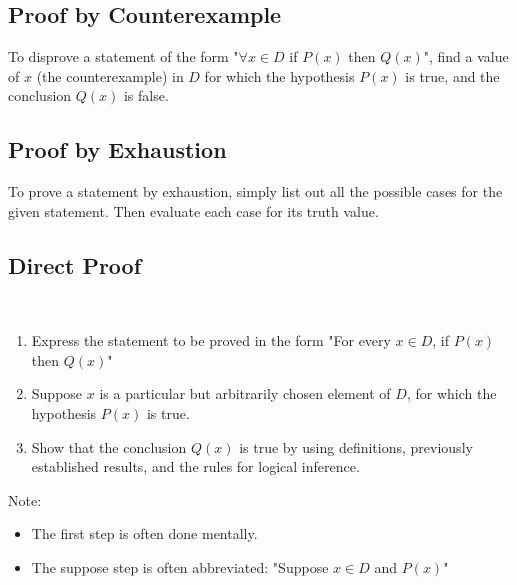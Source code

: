 \documentclass[11pt]{article}
\newcommand*\qistmt[4]{#1 $x \in #2$, if #3 then #4}
\begin{document}
\subsection{Proof by Counterexample}
\begin{definition}\label{def:proof-by-counterexample}
    To disprove a statement of the form "$\forall x \in D$ if $P(x)$ then $Q(x)$",
    find a value of $x$ (the counterexample) in $D$ for which the hypothesis $P(x)$
    is true, and the conclusion $Q(x)$ is false.
\end{definition}

\subsection{Proof by Exhaustion}
\begin{definition}\label{def:proof-by-exhaustion}
    To prove a statement by exhaustion, simply list out all the possible
    cases for the given statement. Then evaluate each case for its truth value. 
\end{definition}

\subsection{Direct Proof}
\begin{definition}\label{def:direct-proof}\

    \begin{enumerate}
        \item Express the statement to be proved in the form "\qistmt{For every}{D}{$P(x)$}{$Q(x)$}"
        \item Suppose $x$ is a particular but arbitrarily chosen element of $D$,
            for which the hypothesis $P(x)$ is true.
        \item Show that the conclusion $Q(x)$ is true by using definitions,
            previously established results, and the rules for logical inference.
    \end{enumerate}

    Note:
    \begin{itemize}
        \item The first step is often done mentally.
        \item The suppose step is often abbreviated: "Suppose $x \in D$ and $P(x)$"
    \end{itemize}
\end{definition}
\end{document}
